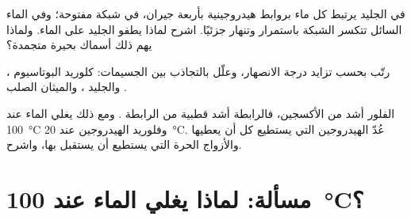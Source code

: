 \begin{exercise}[$\star\star\star$]\label{exo:g11:polarity-and-cohesion:13}
في الجليد يرتبط كل  ماء بروابط هيدروجينية بأربعة جيران، في شبكة مفتوحة؛
وفي الماء السائل تتكسر الشبكة باستمرار وتنهار جزئيًا. اشرح لماذا يطفو الجليد على
الماء. ولماذا يهم ذلك أسماك بحيرة
متجمدة؟
\end{exercise}

\begin{exercise}[$\star\star\star$]\label{exo:g11:polarity-and-cohesion:14}
رتّب بحسب تزايد درجة الانصهار، وعلّل بالتجاذب بين الجسيمات: كلوريد البوتاسيوم
، والجليد ، والميثان الصلب
.
\end{exercise}

\begin{exercise}[$\star\star\star$]\label{exo:g11:polarity-and-cohesion:15}
الفلور أشد  من الأكسجين، فالرابطة  أشد قطبية من الرابطة
. ومع ذلك يغلي الماء عند \qty{100}{\celsius} وفلوريد الهيدروجين عند
\qty{20}{\celsius}. عُدّ  الهيدروجين التي يستطيع كل  أن يعطيها والأزواج
الحرة التي يستطيع أن يستقبل بها، واشرح.
\end{exercise}

\section{مسألة: لماذا يغلي الماء عند \texorpdfstring{\qty{100}{\celsius}}{100 درجة مئوية}؟}

